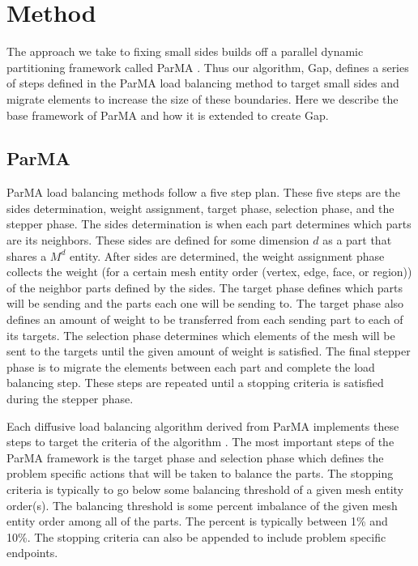 \documentclass{thesis}
\begin{document}
\chapter{Method}

The approach we take to fixing small sides builds off a parallel 
dynamic partitioning framework called ParMA \cite{parma}. Thus our algorithm, Gap,
 defines a series of steps defined in the ParMA load balancing method to target
 small sides and migrate elements to increase the size of these boundaries. Here 
we describe the base framework of ParMA and how it is extended to create Gap.

\section{ParMA}

ParMA load balancing methods follow a five step plan. These five steps 
are the sides determination, weight assignment, target phase, selection
phase, and the stepper phase. The sides determination is when each part 
determines which parts are its neighbors. These sides are defined for some
 dimension $d$ as a part that shares a $M^d$ entity. After sides are 
determined, the weight assignment phase collects the weight (for a certain 
mesh entity order (vertex, edge, face, or region)) of the neighbor parts 
defined by the sides. The 
target phase defines which parts will be sending and the parts each one 
will be sending to. The target phase also defines an amount of weight to 
be transferred from each sending part to each of its targets. The selection 
phase determines which elements of the mesh will be sent to the targets 
until the given amount of weight is satisfied. The final stepper phase is 
to migrate the elements between each part and complete the load balancing 
step. These steps are repeated until a stopping criteria is satisfied 
during the stepper phase. 

Each diffusive load balancing algorithm derived from ParMA implements these 
steps to target the criteria of the algorithm \cite{parma}. The most important 
steps of the ParMA framework is the target phase and selection phase which 
defines the problem specific actions that will be taken to balance the parts. 
The stopping criteria is typically to go below some balancing threshold of 
a given mesh entity order(s). The balancing threshold is some percent imbalance 
of the given mesh entity order among all of the parts. The percent is typically 
between 1\% and 10\%. The stopping criteria can also be appended to include 
problem specific endpoints.
 
\end{document}
